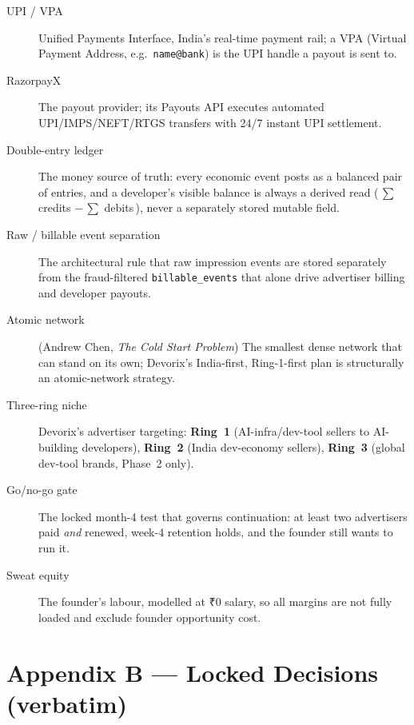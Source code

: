 \begin{description}
  \item[UPI / VPA] Unified Payments Interface, India's real-time payment rail;
        a VPA (Virtual Payment Address, e.g.\ \texttt{name@bank}) is the
        UPI handle a payout is sent to.

  \item[RazorpayX] The payout provider; its Payouts API executes automated
        UPI/IMPS/NEFT/RTGS transfers with 24/7 instant UPI settlement.

  \item[Double-entry ledger] The money source of truth: every economic event
        posts as a balanced pair of entries, and a developer's visible balance
        is always a derived read (\,$\sum$ credits $-\,\sum$ debits\,), never a
        separately stored mutable field.

  \item[Raw / billable event separation] The architectural rule that raw
        impression events are stored separately from the fraud-filtered
        \texttt{billable\_events} that alone drive advertiser billing and
        developer payouts.

  \item[Atomic network] (Andrew Chen, \emph{The Cold Start Problem}) The
        smallest dense network that can stand on its own; Devorix's
        India-first, Ring-1-first plan is structurally an atomic-network
        strategy.

  \item[Three-ring niche] Devorix's advertiser targeting:
        \textbf{Ring~1} (AI-infra/dev-tool sellers to AI-building developers),
        \textbf{Ring~2} (India dev-economy sellers), \textbf{Ring~3} (global
        dev-tool brands, Phase~2 only).

  \item[Go/no-go gate] The locked month-4 test that governs continuation: at
        least two advertisers paid \emph{and} renewed, week-4 retention holds,
        and the founder still wants to run it.

  \item[Sweat equity] The founder's labour, modelled at ₹0 salary, so all
        margins are not fully loaded and exclude founder opportunity cost.
\end{description}

\section{Appendix B --- Locked Decisions (verbatim)}
\label{app:locked-decisions}

